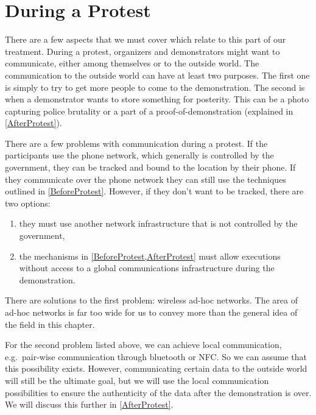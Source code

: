\section{During a Protest}
\label{DuringProtest}

There are a few aspects that we must cover which relate to this part of our 
treatment.
During a protest, organizers and demonstrators might want to communicate, 
either among themselves or to the outside world.
The communication to the outside world can have at least two purposes.
The first one is simply to try to get more people to come to the demonstration.
The second is when a demonstrator wants to store something for posterity.
This can be a photo capturing police brutality or a part of 
a proof-of-demonstration (explained in \cref{AfterProtest}).

There are a few problems with communication during a protest.
If the participants use the phone network, which generally is controlled by the 
government, they can be tracked and bound to the location by their phone.
If they communicate over the phone network they can still use the techniques 
outlined in \cref{BeforeProtest}.
However, if they don't want to be tracked, there are two options:
\begin{enumerate}
  \item they must use another network infrastructure that is not controlled by 
    the government,
  \item the mechanisms in \cref{BeforeProtest,AfterProtest} must allow 
    executions without access to a global communications infrastructure during 
    the demonstration.
\end{enumerate}

There are solutions to the first problem: wireless ad-hoc networks.
The area of ad-hoc networks is far too wide for us to convey more than the 
general idea of the field in this chapter.


For the second problem listed above, we can achieve local communication, e.g.\ 
pair-wise communication through bluetooth or \ac{NFC}.
So we can assume that this possibility exists.
However, communicating certain data to the outside world will still be the 
ultimate goal, but we will use the local communication possibilities to ensure 
the authenticity of the data after the demonstration is over.
We will discuss this further in \cref{AfterProtest}.

